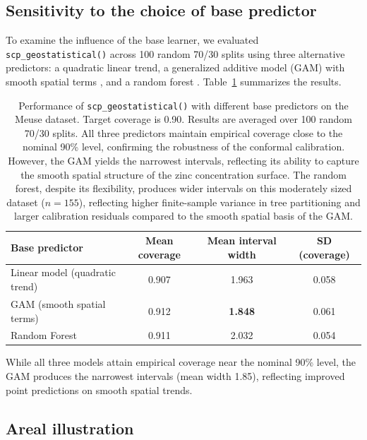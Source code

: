 \documentclass[article]{jss}
\begin{document}
\subsection{Sensitivity to the choice of base predictor}

To examine the influence of the base learner, we evaluated \texttt{scp\_geostatistical()} across 100 random 70/30 splits using three alternative predictors: a quadratic linear trend, a generalized additive model (GAM) with smooth spatial terms \citep[fitted via the  package;][]{Wood:2017}, and a random forest \citep[fitted via the  package;][]{Wright+Ziegler:2017}. Table~\ref{tab:models} summarizes the results.

\begin{table}[t!]
\centering
\begin{tabular}{lccc}
\toprule
Base predictor & Mean coverage & Mean interval width & SD (coverage) \\
\midrule
Linear model (quadratic trend) & 0.907 & 1.963 & 0.058 \\
GAM (smooth spatial terms) & 0.912 & \textbf{1.848} & 0.061 \\
Random Forest & 0.911 & 2.032 & 0.054 \\
\bottomrule
\end{tabular}
\caption{Performance of \texttt{scp\_geostatistical()} with different base predictors on the Meuse dataset. Target coverage is 0.90. Results are averaged over 100 random 70/30 splits. All three predictors maintain empirical coverage close to the nominal 90\% level, confirming the robustness of the conformal calibration. However, the GAM yields the narrowest intervals, reflecting its ability to capture the smooth spatial structure of the zinc concentration surface. The random forest, despite its flexibility, produces wider intervals on this moderately sized dataset ($n=155$), reflecting higher finite-sample variance in tree partitioning and larger calibration residuals compared to the smooth spatial basis of the GAM.}
\label{tab:models}
\end{table}

While all three models attain empirical coverage near the nominal 90\% level, the GAM produces the narrowest intervals (mean width 1.85), reflecting improved point predictions on smooth spatial trends.

\subsection{Areal illustration}
\end{document}
